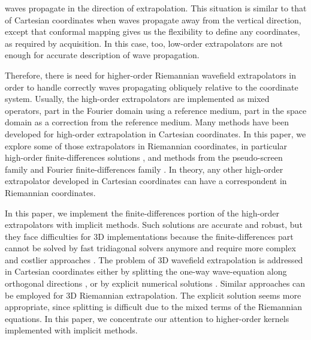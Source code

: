 waves propagate in the direction of extrapolation. This situation is
similar to that of Cartesian coordinates when waves propagate away
from the vertical direction, except that conformal mapping gives us
the flexibility to define any coordinates, as required by
acquisition. In this case, too, low-order extrapolators are not enough
for accurate description of wave propagation.  
%
\par Therefore, there is need for higher-order Riemannian wavefield
extrapolators in order to handle correctly waves propagating obliquely
relative to the coordinate system. Usually, the high-order
extrapolators are implemented as mixed operators, part in the Fourier
domain using a reference medium, part in the space domain as a
correction from the reference medium. Many methods have been developed
for high-order extrapolation in Cartesian coordinates. In this paper,
we explore some of those extrapolators in Riemannian coordinates, in
particular high-order finite-differences solutions
\cite[]{Claerbout.iei}, and methods from the pseudo-screen family
\cite[]{GEO64-05-15241534} and Fourier finite-differences family
\cite[]{GEO59-12-18821893,GEO67-03-08720882}. In theory, any other
high-order extrapolator developed in Cartesian coordinates can have a
correspondent in Riemannian coordinates.  
%
\par In this paper, we implement the finite-differences portion of the
high-order extrapolators with implicit methods. Such solutions are
accurate and robust, but they face difficulties for 3D implementations
because the finite-differences part cannot be solved by fast
tridiagonal solvers anymore and require more complex and costlier
approaches \cite[]{GEO63-05-15321541,SEG-1998-1124}. The problem of 3D
wavefield extrapolation is addressed in Cartesian coordinates either
by splitting the one-way wave-equation along orthogonal directions
\cite[]{GEO62-02-05540567}, or by explicit numerical solutions
\cite[]{GEO56-11-17701777}. Similar approaches can be employed for 3D
Riemannian extrapolation. The explicit solution seems more
appropriate, since splitting is difficult due to the mixed terms of
the Riemannian equations. In this paper, we concentrate our attention
to higher-order kernels implemented with implicit methods.
